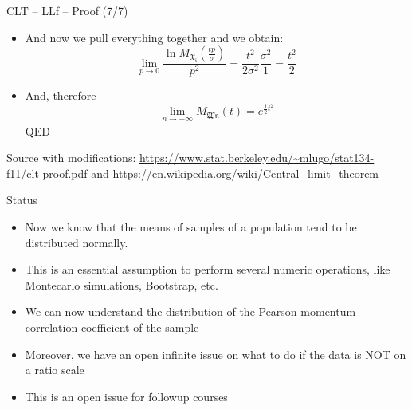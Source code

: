 \documentclass{beamer}
\begin{document}
\begin{frame}
{\centerline{CLT -- LLf -- Proof (7/7)}}

\begin{itemize}
\item And now we pull everything together and we obtain:
$$\lim_{p \to 0} \frac{\ln M_\mathfrak{X_i}(\frac{tp}{\sigma})}{p^2} = \frac{t^2}{2\sigma^2} \frac{\sigma^2}{1} = \frac{t^2}{2} $$
\item And, therefore
$$\lim_{n \to + \infty} M_\mathfrak{Wn}(t) = e ^{\frac{1}{2}t^2}$$
QED
\end{itemize}

\begin{center}
\tiny 
Source with modifications: \url{https://www.stat.berkeley.edu/~mlugo/stat134-f11/clt-proof.pdf} and \url{https://en.wikipedia.org/wiki/Central_limit_theorem}
\end{center}
\end{frame}



\begin{frame}
{\centerline{Status}}

\begin{itemize}
\item Now we know that the means of samples of a population tend to be distributed normally.
\item This is an essential assumption to perform several numeric operations, like Montecarlo simulations, Bootstrap, etc.
\item We can now understand the distribution of the Pearson momentum correlation coefficient of the sample
\item Moreover, we have an open infinite issue on what to do if the data is NOT on a ratio scale
\item This is an open issue for followup courses
\end{itemize}


\end{frame}
\end{document}
